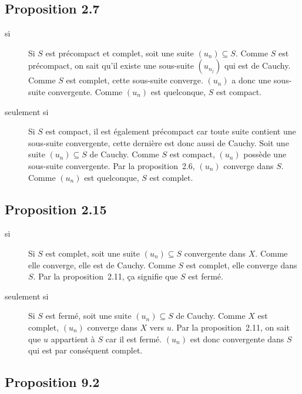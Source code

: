 \subsection{Proposition 2.7}
\begin{description}
  \item[si]
    Si $S$ est précompact et complet,
    soit une suite $(u_n) \subseteq S$.
    Comme $S$ est précompact, on sait qu'il existe
    une sous-suite $(u_{n_j})$ qui est de Cauchy.
    Comme $S$ est complet, cette sous-suite converge.
    $(u_n)$ a donc une sous-suite convergente.
    Comme $(u_n)$ est quelconque, $S$ est compact.
  \item[seulement si]
    Si $S$ est compact, il est également précompact car
    toute suite contient une sous-suite convergente,
    cette dernière est donc aussi de Cauchy.
    Soit une suite $(u_n) \subseteq S$ de Cauchy.
    Comme $S$ est compact, $(u_n)$ possède une sous-suite convergente.
    Par la proposition~2.6, $(u_n)$ converge dans $S$.
    Comme $(u_n)$ est quelconque, $S$ est complet.
\end{description}

\subsection{Proposition 2.15}
\begin{description}
  \item[si]
    Si $S$ est complet,
    soit une suite $(u_n) \subseteq S$ convergente dans $X$.
    Comme elle converge, elle est de Cauchy.
    Comme $S$ est complet, elle converge dans $S$.
    Par la proposition~2.11, ça signifie que $S$ est fermé.
  \item[seulement si]
    Si $S$ est fermé,
    soit une suite $(u_n) \subseteq S$ de Cauchy.
    Comme $X$ est complet, $(u_n)$ converge dans $X$ vers $u$.
    Par la proposition~2.11, on sait que $u$ appartient à $S$ car il est fermé.
    $(u_n)$ est donc convergente dans $S$ qui est par conséquent complet.
\end{description}

\subsection{Proposition 9.2}

